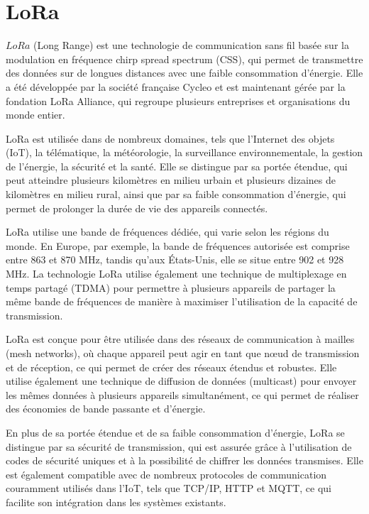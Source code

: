 \documentclass[12pt,a4paper,oneside, titlepage]{report}
\begin{document}
\section{LoRa}

$LoRa$ (Long Range) est une technologie de communication sans fil basée sur la modulation en fréquence chirp spread spectrum (CSS), qui permet de transmettre des données sur de longues distances avec une faible consommation d'énergie. Elle a été développée par la société française Cycleo et est maintenant gérée par la fondation LoRa Alliance, qui regroupe plusieurs entreprises et organisations du monde entier.

LoRa est utilisée dans de nombreux domaines, tels que l'Internet des objets (IoT), la télématique, la météorologie, la surveillance environnementale, la gestion de l'énergie, la sécurité et la santé. Elle se distingue par sa portée étendue, qui peut atteindre plusieurs kilomètres en milieu urbain et plusieurs dizaines de kilomètres en milieu rural, ainsi que par sa faible consommation d'énergie, qui permet de prolonger la durée de vie des appareils connectés.

LoRa utilise une bande de fréquences dédiée, qui varie selon les régions du monde. En Europe, par exemple, la bande de fréquences autorisée est comprise entre 863 et 870 MHz, tandis qu'aux États-Unis, elle se situe entre 902 et 928 MHz. La technologie LoRa utilise également une technique de multiplexage en temps partagé (TDMA) pour permettre à plusieurs appareils de partager la même bande de fréquences de manière à maximiser l'utilisation de la capacité de transmission.

LoRa est conçue pour être utilisée dans des réseaux de communication à mailles (mesh networks), où chaque appareil peut agir en tant que nœud de transmission et de réception, ce qui permet de créer des réseaux étendus et robustes. Elle utilise également une technique de diffusion de données (multicast) pour envoyer les mêmes données à plusieurs appareils simultanément, ce qui permet de réaliser des économies de bande passante et d'énergie.

En plus de sa portée étendue et de sa faible consommation d'énergie, LoRa se distingue par sa sécurité de transmission, qui est assurée grâce à l'utilisation de codes de sécurité uniques et à la possibilité de chiffrer les données transmises. Elle est également compatible avec de nombreux protocoles de communication couramment utilisés dans l'IoT, tels que TCP/IP, HTTP et MQTT, ce qui facilite son intégration dans les systèmes existants.
\end{document}
